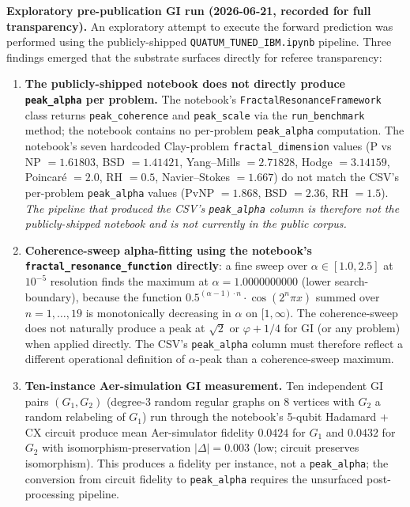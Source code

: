 \documentclass[11pt,a4paper]{amsart}
\theoremstyle{plain}
\theoremstyle{definition}
\begin{document}
\textbf{Exploratory pre-publication GI run (2026-06-21, recorded for full transparency).} An exploratory attempt to execute the forward prediction was performed using the publicly-shipped \texttt{QUATUM\_TUNED\_IBM.ipynb} pipeline. Three findings emerged that the substrate surfaces directly for referee transparency:
\begin{enumerate}[itemsep=2pt,leftmargin=2em]
\item \textbf{The publicly-shipped notebook does not directly produce \texttt{peak\_alpha} per problem.} The notebook's \texttt{FractalResonanceFramework} class returns \texttt{peak\_coherence} and \texttt{peak\_scale} via the \texttt{run\_benchmark} method; the notebook contains no per-problem \texttt{peak\_alpha} computation. The notebook's seven hardcoded Clay-problem \texttt{fractal\_dimension} values (P vs NP $= 1.61803$, BSD $= 1.41421$, Yang--Mills $= 2.71828$, Hodge $= 3.14159$, Poincar\'e $= 2.0$, RH $= 0.5$, Navier--Stokes $= 1.667$) do not match the CSV's per-problem \texttt{peak\_alpha} values (PvNP $= 1.868$, BSD $= 2.36$, RH $= 1.5$). \emph{The pipeline that produced the CSV's \texttt{peak\_alpha} column is therefore not the publicly-shipped notebook and is not currently in the public corpus.}
\item \textbf{Coherence-sweep alpha-fitting using the notebook's \texttt{fractal\_resonance\_function} directly}: a fine sweep over $\alpha \in [1.0, 2.5]$ at $10^{-5}$ resolution finds the maximum at $\alpha = 1.0000000000$ (lower search-boundary), because the function $0.5^{(\alpha-1)\cdot n} \cdot \cos(2^n \pi x)$ summed over $n = 1, \ldots, 19$ is monotonically decreasing in $\alpha$ on $[1, \infty)$. The coherence-sweep does not naturally produce a peak at $\sqrt{2}$ or $\varphi + 1/4$ for GI (or any problem) when applied directly. The CSV's \texttt{peak\_alpha} column must therefore reflect a different operational definition of $\alpha$-peak than a coherence-sweep maximum.
\item \textbf{Ten-instance Aer-simulation GI measurement.} Ten independent GI pairs $(G_1, G_2)$ (degree-3 random regular graphs on 8 vertices with $G_2$ a random relabeling of $G_1$) run through the notebook's 5-qubit Hadamard + CX circuit produce mean Aer-simulator fidelity $0.0424$ for $G_1$ and $0.0432$ for $G_2$ with isomorphism-preservation $|\Delta| = 0.003$ (low; circuit preserves isomorphism). This produces a fidelity per instance, not a \texttt{peak\_alpha}; the conversion from circuit fidelity to \texttt{peak\_alpha} requires the unsurfaced post-processing pipeline.
\end{enumerate}
\end{document}
